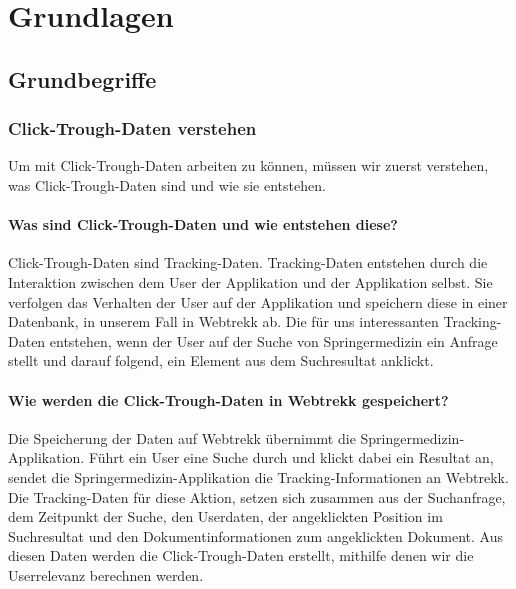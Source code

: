 %
\chapter{Grundlagen}
\label{sec:Grundlagen}


\section{Grundbegriffe}
\label{sec:Grundlagen:Grundbegriffe}

\subsection{Click-Trough-Daten verstehen}
\label{sec:Grundlagen:Grundbegriffe:Click-Trough-Daten}

Um mit Click-Trough-Daten arbeiten zu können, müssen wir zuerst verstehen, was Click-Trough-Daten sind und wie sie entstehen. 

\subsubsection{Was sind Click-Trough-Daten und wie entstehen diese?}
\label{sec:Grundlagen:Grundbegriffe:Click-Trough-Daten:WasSindClick-Trough-Daten}

Click-Trough-Daten sind Tracking-Daten. Tracking-Daten entstehen durch die Interaktion zwischen dem User der Applikation und der Applikation selbst. Sie verfolgen das Verhalten der User auf der Applikation und speichern diese in einer Datenbank, in unserem Fall in Webtrekk ab. Die für uns interessanten Tracking-Daten entstehen, wenn der User auf der Suche von Springermedizin ein Anfrage stellt und darauf folgend, ein Element aus dem Suchresultat anklickt.

\subsubsection{Wie werden die Click-Trough-Daten in Webtrekk gespeichert?}
\label{sec:Grundlagen:Grundbegriffe:Click-Trough-Daten:SpeichernClick-Trough-Daten}

Die Speicherung der Daten auf Webtrekk übernimmt die Springermedizin-Applikation. Führt ein User eine Suche durch und klickt dabei ein Resultat an, sendet die Springermedizin-Applikation die Tracking-Informationen an Webtrekk. Die Tracking-Daten für diese Aktion, setzen sich zusammen aus der Suchanfrage, dem Zeitpunkt der Suche, den Userdaten, der angeklickten Position im Suchresultat und den Dokumentinformationen zum angeklickten Dokument. Aus diesen Daten werden die Click-Trough-Daten erstellt, mithilfe denen wir die Userrelevanz berechnen werden.

